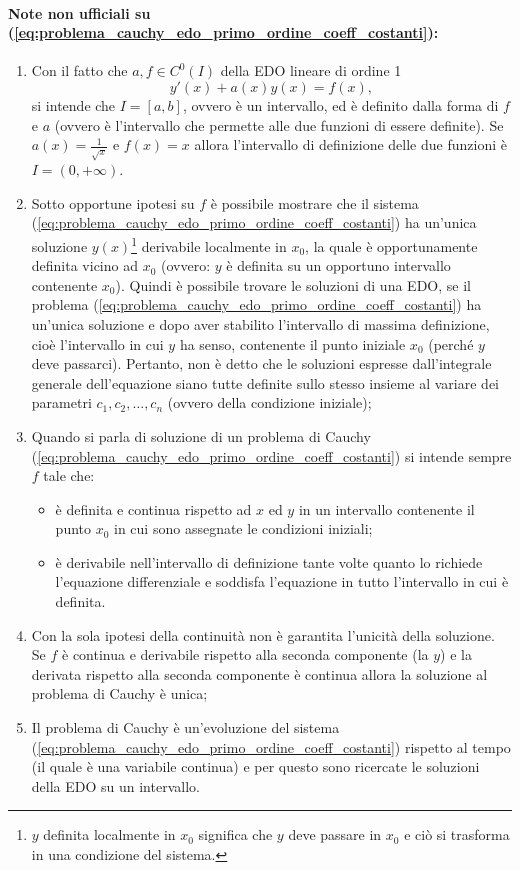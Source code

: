 \paragraph{Note non ufficiali su (\ref{eq:problema_cauchy_edo_primo_ordine_coeff_costanti}):}
\begin{enumerate}
	\item Con il fatto che $a,f\in C^0(I)$ della EDO lineare di ordine 1
	\begin{equation*}
		y'(x) + a(x)y(x)=f(x),
	\end{equation*} 
	si intende che  $I=[a,b]$, ovvero è un intervallo, ed è definito dalla forma di $f$ e $a$ (ovvero è l'intervallo che permette alle due funzioni di essere definite). Se $a(x)=\frac{1}{\sqrt{x}}$ e $f(x)=x$ allora l'intervallo di definizione delle due funzioni è $I=(0, +\infty)$.
    \item Sotto opportune ipotesi su $f$ è possibile mostrare che il sistema (\ref{eq:problema_cauchy_edo_primo_ordine_coeff_costanti}) ha un'unica soluzione $y(x)$\footnote{$y$ definita localmente in $x_0$ significa che $y$ deve passare in $x_0$ e ciò si trasforma in una condizione del sistema.} derivabile localmente in $x_0$, la quale è opportunamente definita vicino ad $x_0$ (ovvero: $y$ è definita su un opportuno intervallo contenente $x_0$). Quindi è possibile trovare le soluzioni di una EDO, se il problema (\ref{eq:problema_cauchy_edo_primo_ordine_coeff_costanti}) ha un'unica soluzione e dopo aver stabilito l'intervallo di massima definizione, cioè l'intervallo in cui $y$ ha senso, contenente il punto iniziale $x_0$ (perché $y$ deve passarci). Pertanto, non è detto che le soluzioni espresse dall'integrale generale dell'equazione siano tutte definite sullo stesso insieme al variare dei parametri $c_1 , c_2 ,\hdots ,c_n$ (ovvero della condizione iniziale);
    \item Quando si parla di soluzione di un problema di Cauchy (\ref{eq:problema_cauchy_edo_primo_ordine_coeff_costanti}) si intende sempre $f$ tale che:
    \begin{itemize}
        \item è definita e continua rispetto ad $x$ ed $y$ in un intervallo contenente il punto $x_0$ in cui sono assegnate le condizioni iniziali;
        \item è derivabile nell'intervallo di definizione tante volte quanto lo richiede l'equazione differenziale e soddisfa l'equazione in tutto l'intervallo in cui è definita.
    \end{itemize}
    \item Con la sola ipotesi della continuità non è garantita l'unicità della soluzione. Se $f$ è continua e derivabile rispetto alla seconda componente (la $y$) e la derivata rispetto alla seconda componente è continua allora la soluzione al problema di Cauchy è unica;
    \item Il problema di Cauchy è un'evoluzione del sistema (\ref{eq:problema_cauchy_edo_primo_ordine_coeff_costanti}) rispetto al tempo (il quale è una variabile continua) e per questo sono ricercate le soluzioni della EDO su un intervallo.
\end{enumerate}

